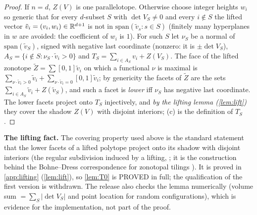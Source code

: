\begin{proof}
If $n=d$, $Z(V)$ is one parallelotope. Otherwise choose integer heights $w_i$ so generic that for every $d$-subset $S$ with $\det V_S\ne0$ and every $i\notin S$ the lifted vector $\tilde v_i=(v_i,w_i)\in\mathbb R^{d+1}$ is not in $\mathrm{span}(\tilde v_s:s\in S)$ (finitely many hyperplanes in $w$ are avoided: the coefficient of $w_i$ is $1$). For such $S$ let $\nu_S$ be a normal of $\mathrm{span}(\tilde v_S)$, signed with negative last coordinate (nonzero: it is $\pm\det V_S$), $A_S=\{i\notin S:\nu_S\cdot\tilde v_i>0\}$ and $T_S=\sum_{i\in A_S}v_i+Z(V_S)$. The face of the lifted zonotope $\tilde Z=\sum[0,1]\tilde v_i$ on which a functional $\nu$ is maximal is $\sum_{\nu\cdot\tilde v_i>0}\tilde v_i+\sum_{\nu\cdot\tilde v_i=0}[0,1]\tilde v_i$; by genericity the facets of $\tilde Z$ are the sets $\sum_{i\in A_S}\tilde v_i+Z(\tilde v_S)$, and such a facet is \emph{lower} iff $\nu_S$ has negative last coordinate. The lower facets project onto $T_S$ injectively, and \emph{by the lifting lemma (\cref{lem:lift})} they cover the shadow $Z(V)$ with disjoint interiors; (c) is the definition of $T_S$. \qedhere
\end{proof}
\noindent\textbf{The lifting fact.} The covering property used above is the standard statement that the lower facets of a lifted polytope project onto its shadow with disjoint interiors (the regular subdivision induced by a lifting, \cite{Ziegler1995,DLRS2010}; it is the construction behind the Bohne--Dress correspondence for zonotopal tilings \cite{Bohne1992,RGZ1994,HRS2000,BLSWZ1999}). It is proved in \cref{app:lifting} (\cref{lem:lift}), so \cref{lem:T0} is PROVED in full; the qualification of the first version is withdrawn. The release also checks the lemma numerically (volume sum $=\sum_S|\det V_S|$ and point location for random configurations), which is evidence for the implementation, not part of the proof.

